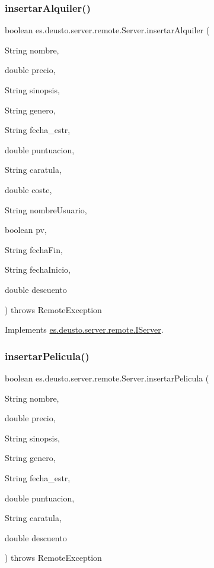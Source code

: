 \subsubsection{\texorpdfstring{insertarAlquiler()}{insertarAlquiler()}}
{\footnotesize\ttfamily boolean es.\+deusto.\+server.\+remote.\+Server.\+insertar\+Alquiler (\begin{DoxyParamCaption}\item[{String}]{nombre,  }\item[{double}]{precio,  }\item[{String}]{sinopsis,  }\item[{String}]{genero,  }\item[{String}]{fecha\+\_\+estr,  }\item[{double}]{puntuacion,  }\item[{String}]{caratula,  }\item[{double}]{coste,  }\item[{String}]{nombre\+Usuario,  }\item[{boolean}]{pv,  }\item[{String}]{fecha\+Fin,  }\item[{String}]{fecha\+Inicio,  }\item[{double}]{descuento }\end{DoxyParamCaption}) throws Remote\+Exception}



Implements \mbox{\hyperlink{interfacees_1_1deusto_1_1server_1_1remote_1_1_i_server_adc798ebfbd387dc7ef9c8d86a37eb3bb}{es.\+deusto.\+server.\+remote.\+I\+Server}}.

\mbox{\label{classes_1_1deusto_1_1server_1_1remote_1_1_server_a826b0343cb4dd20617cb7ee299de4171}} 
\subsubsection{\texorpdfstring{insertarPelicula()}{insertarPelicula()}}
{\footnotesize\ttfamily boolean es.\+deusto.\+server.\+remote.\+Server.\+insertar\+Pelicula (\begin{DoxyParamCaption}\item[{String}]{nombre,  }\item[{double}]{precio,  }\item[{String}]{sinopsis,  }\item[{String}]{genero,  }\item[{String}]{fecha\+\_\+estr,  }\item[{double}]{puntuacion,  }\item[{String}]{caratula,  }\item[{double}]{descuento }\end{DoxyParamCaption}) throws Remote\+Exception}



